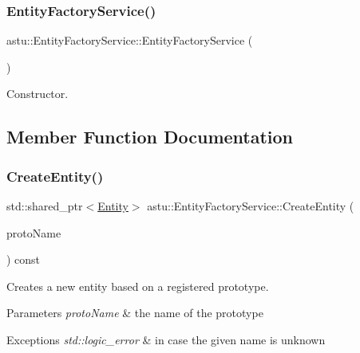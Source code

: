 \subsubsection{\texorpdfstring{Entity\+Factory\+Service()}{EntityFactoryService()}}
{\footnotesize\ttfamily astu\+::\+Entity\+Factory\+Service\+::\+Entity\+Factory\+Service (\begin{DoxyParamCaption}{ }\end{DoxyParamCaption})}

Constructor. 

\subsection{Member Function Documentation}
\mbox{\label{classastu_1_1EntityFactoryService_aef424f6a70cbc918bea4a7edd738877f}} 
\subsubsection{\texorpdfstring{Create\+Entity()}{CreateEntity()}}
{\footnotesize\ttfamily std\+::shared\+\_\+ptr$<$\hyperlink{classastu_1_1Entity}{Entity}$>$ astu\+::\+Entity\+Factory\+Service\+::\+Create\+Entity (\begin{DoxyParamCaption}\item[{const std\+::string \&}]{proto\+Name }\end{DoxyParamCaption}) const}

Creates a new entity based on a registered prototype.


\begin{DoxyParams}{Parameters}
{\em proto\+Name} & the name of the prototype \\
\hline
\end{DoxyParams}

\begin{DoxyExceptions}{Exceptions}
{\em std\+::logic\+\_\+error} & in case the given name is unknown \\
\hline
\end{DoxyExceptions}
\mbox{\label{classastu_1_1EntityFactoryService_a2ffee25bef45ed4b845dd2b9c852496d}} 
